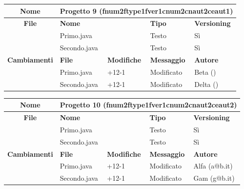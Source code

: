 \begin{table}[ht]
\footnotesize
\begin{tabular}{|c|p{2.5cm}|p{2cm}|p{2.5cm}|p{2.5cm}|}
  \hline
  \textbf{Nome}	& \multicolumn{4}{l|}{Progetto 9 (fnum2ftype1fver1cnum2cnaut2ceaut1)} 									\\
  \hline
  \rowcolor{lightgray}\textbf{File} 		& \multicolumn{2}{l|}{\textbf{Nome}}		& \textbf{Tipo}		& \textbf{Versioning} 		\\
						\cline{2-5}
						& \multicolumn{2}{l|}{Primo.java}		& Testo			& Sì				\\
						\cline{2-5}
						& \multicolumn{2}{l|}{Secondo.java}		& Testo			& Sì				\\
  \hline
  \rowcolor{lightgray}\textbf{Cambiamenti}	& \textbf{File}		&\textbf{Modifiche}	& \textbf{Messaggio}	& \textbf{Autore}		\\
						\cline{2-5}
						& Primo.java		& +12-1	  		& Modificato		& Beta ()			\\
						\cline{2-5}
						& Secondo.java		& +12-1	  		& Modificato		& Delta ()			\\
  \hline
\end{tabular}
\end{table}
\clearpage
\begin{table}[ht]
\footnotesize
\begin{tabular}{|c|p{2.5cm}|p{2cm}|p{2.5cm}|p{2.5cm}|}
  \hline
  \textbf{Nome}	& \multicolumn{4}{l|}{Progetto 10 (fnum2ftype1fver1cnum2cnaut2ceaut2)} 									\\
  \hline
  \rowcolor{lightgray}\textbf{File} 		& \multicolumn{2}{l|}{\textbf{Nome}}		& \textbf{Tipo}		& \textbf{Versioning} 		\\
						\cline{2-5}
						& \multicolumn{2}{l|}{Primo.java}		& Testo			& Sì				\\
						\cline{2-5}
						& \multicolumn{2}{l|}{Secondo.java}		& Testo			& Sì				\\
  \hline
  \rowcolor{lightgray}\textbf{Cambiamenti}	& \textbf{File}		&\textbf{Modifiche}	& \textbf{Messaggio}	& \textbf{Autore}		\\
						\cline{2-5}
						& Primo.java		& +12-1	  		& Modificato		& Alfa (a@b.it)			\\
						\cline{2-5}
						& Secondo.java		& +12-1	  		& Modificato		& Gam (g@b.it)			\\
						
  \hline
\end{tabular}
\end{table}


